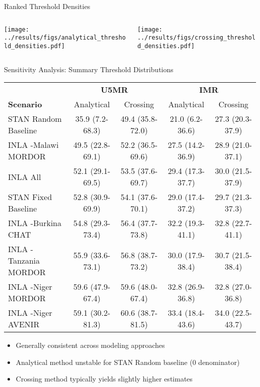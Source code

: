 \documentclass[aspectratio=169]{beamer}\usepackage[]{graphicx}\usepackage[dvipsnames]{xcolor}
\begin{document}
\begin{frame}{Ranked Threshold Densities}
\begin{columns}
\begin{column}{0.5\textwidth}
\begin{center}
\texttt{[image: ../results/figs/analytical\_threshold\_densities.pdf]}
\end{center}
\end{column}
\begin{column}{0.5\textwidth}
\begin{center}
\texttt{[image: ../results/figs/crossing\_threshold\_densities.pdf]}
\end{center}
\end{column}
\end{columns}
\end{frame}

\begin{frame}{Sensitivity Analysis: Summary Threshold Distributions}
\begin{center}\footnotesize\begin{tabular}{l|cc|cc}\toprule& \multicolumn{2}{c}{\textbf{U5MR}} & \multicolumn{2}{c}{\textbf{IMR}} \\\textbf{Scenario} & Analytical & Crossing & Analytical & Crossing \\\midrule STAN Random Baseline & 35.9 (7.2-68.3) & 49.4 (35.8-72.0) & 21.0 (6.2-36.6) & 27.3 (20.3-37.9) \\INLA -Malawi MORDOR & 49.5 (22.8-69.1) & 52.2 (36.5-69.6) & 27.5 (14.2-36.9) & 28.9 (21.0-37.1) \\INLA All & 52.1 (29.1-69.5) & 53.5 (37.6-69.7) & 29.4 (17.3-37.7) & 30.0 (21.5-37.9) \\STAN Fixed Baseline & 52.8 (30.9-69.9) & 54.1 (37.6-70.1) & 29.0 (17.4-37.2) & 29.7 (21.3-37.3) \\INLA -Burkina CHAT & 54.8 (29.3-73.4) & 56.4 (37.7-73.8) & 32.2 (19.3-41.1) & 32.8 (22.7-41.1) \\INLA -Tanzania MORDOR & 55.9 (33.6-73.1) & 56.8 (38.7-73.2) & 30.0 (17.9-38.4) & 30.7 (21.5-38.4) \\INLA -Niger MORDOR & 59.6 (47.9-67.4) & 59.6 (48.0-67.4) & 32.8 (26.9-36.8) & 32.8 (27.0-36.8) \\INLA -Niger AVENIR & 59.1 (30.2-81.3) & 60.6 (38.7-81.5) & 33.4 (18.4-43.6) & 34.0 (22.5-43.7) \\\bottomrule\end{tabular}\end{center}

\vspace{0.3cm}
\begin{itemize}
  \item Generally consistent across modeling approaches
  \item Analytical method unstable for STAN Random baseline (0 denominator)
  \item Crossing method typically yields slightly higher estimates
\end{itemize}
\end{frame}
\end{document}
